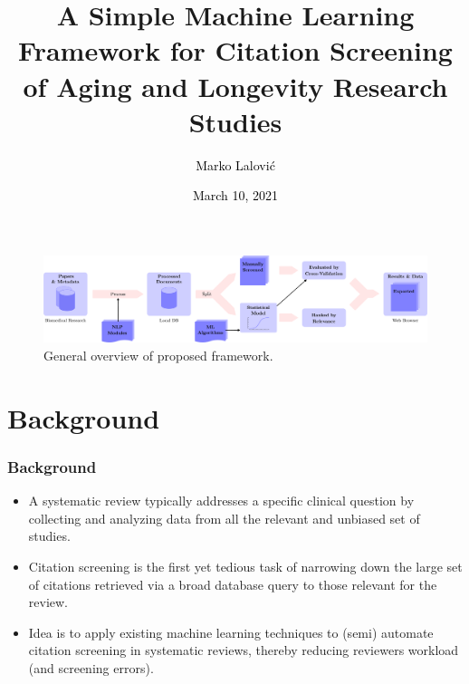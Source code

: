 \documentclass[10pt, xcolor={dvipsnames}]{beamer}
\title[Longevity Research Screening]{A Simple Machine Learning Framework for Citation Screening of Aging and Longevity Research Studies}
\author[\textcolor{white}{Marko Lalović}]{\textcolor{black}{Marko Lalović}}
\date[\textcolor{white}{March 10, 2021}]{\textcolor{black}{March 10, 2021}}
\begin{document}
\begin{frame}
\begin{center}
\maketitle
\begin{figure}
    \includegraphics[width=\linewidth]{../report/diagrams/general-overview/general-overview-crop.pdf}
    \caption{General overview of proposed framework.}
\end{figure}    
\end{center}
\end{frame}



\section{Background}
\begin{frame}
\frametitle{Background}
\begin{itemize}
\item A systematic review typically addresses a specific clinical question by collecting and analyzing data from all the relevant and unbiased set of studies. 
\item Citation screening is the first yet tedious task of narrowing down the large set of citations retrieved via a broad database query to those relevant for the review.
\item Idea is to apply existing machine learning techniques to (semi) automate citation screening in systematic reviews, thereby reducing reviewers workload (and screening errors).
\end{itemize}
\end{frame}
\end{document}
